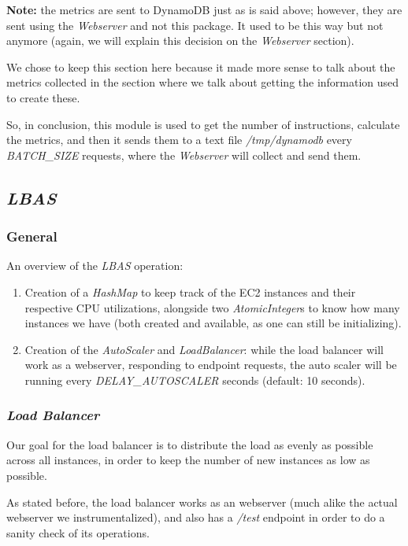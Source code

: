 \documentclass{article}
\begin{document}
\textbf{Note:} the metrics are sent to DynamoDB just as is said above; however,
they are sent using the \textit{Webserver} and not this package. It used to be
this way but not anymore (again, we will explain this decision on the
\textit{Webserver} section).

We chose to keep this section here because it made
more sense to talk about the metrics collected in the section where we talk
about getting the information used to create these.

So, in conclusion, this module is used to get the number of instructions,
calculate the metrics, and then it sends them to a text file
\textit{/tmp/dynamodb} every \textit{BATCH\_SIZE} requests, where the
\textit{Webserver} will collect and send them.

\subsection{\textit{LBAS}}

\subsubsection{General}

An overview of the \textit{LBAS} operation:
\begin{enumerate}
    \item Creation of a \textit{HashMap} to keep track of the EC2 instances and
        their respective CPU utilizations, alongside two \textit{AtomicInteger}s
        to know how many instances we have (both created and available, as one
        can still be initializing).
    \item Creation of the \textit{AutoScaler} and \textit{LoadBalancer}: while
        the load balancer will work as a webserver, responding to endpoint
        requests, the auto scaler will be running every
        \textit{DELAY\_AUTOSCALER} seconds (default: 10 seconds).
\end{enumerate}

\subsubsection{\textit{Load Balancer}}

Our goal for the load balancer is to distribute the load as evenly as possible
across all instances, in order to keep the number of new instances as low as
possible.

As stated before, the load balancer works as an webserver (much alike the actual
webserver we instrumentalized), and also has a \textit{/test} endpoint in order
to do a sanity check of its operations.
\end{document}
